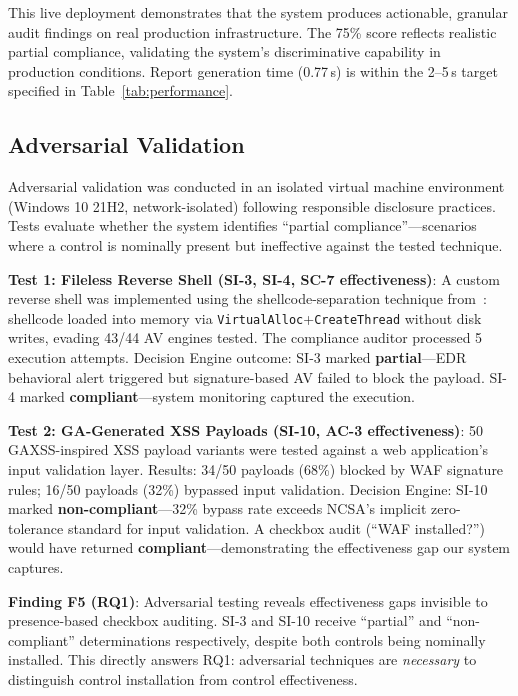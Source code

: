 \documentclass[futureinternet,article,submit,pdftex,moreauthors]{Definitions/mdpi}
\begin{document}
This live deployment demonstrates that the system produces actionable, granular audit findings
on real production infrastructure. The 75\% score reflects realistic partial compliance,
validating the system's discriminative capability in production conditions. Report generation
time (0.77\,s) is within the 2--5\,s target specified in Table~\ref{tab:performance}.

\subsection{Adversarial Validation}
\label{sec:adversarial}

Adversarial validation was conducted in an isolated virtual machine environment (Windows 10
21H2, network-isolated) following responsible disclosure practices. Tests evaluate whether the
system identifies ``partial compliance''---scenarios where a control is nominally present but
ineffective against the tested technique.

\textbf{Test 1: Fileless Reverse Shell (SI-3, SI-4, SC-7 effectiveness)}: A custom reverse
shell was implemented using the shellcode-separation technique from~\cite{reverse_shell_paper}:
shellcode loaded into memory via \texttt{VirtualAlloc}+\texttt{CreateThread} without disk
writes, evading 43/44 AV engines tested. The compliance auditor processed 5 execution attempts.
Decision Engine outcome: SI-3 marked \textbf{partial}---EDR behavioral alert triggered but
signature-based AV failed to block the payload. SI-4 marked \textbf{compliant}---system
monitoring captured the execution.

\textbf{Test 2: GA-Generated XSS Payloads (SI-10, AC-3 effectiveness)}: 50 GAXSS-inspired
XSS payload variants were tested against a web application's input validation layer. Results:
34/50 payloads (68\%) blocked by WAF signature rules; 16/50 payloads (32\%) bypassed input
validation. Decision Engine: SI-10 marked \textbf{non-compliant}---32\% bypass rate exceeds
NCSA's implicit zero-tolerance standard for input validation. A checkbox audit (``WAF
installed?'') would have returned \textbf{compliant}---demonstrating the effectiveness gap
our system captures.

\textbf{Finding F5 (RQ1)}: Adversarial testing reveals effectiveness gaps invisible to
presence-based checkbox auditing. SI-3 and SI-10 receive ``partial'' and ``non-compliant''
determinations respectively, despite both controls being nominally installed. This directly
answers RQ1: adversarial techniques are \textit{necessary} to distinguish control installation
from control effectiveness.
\end{document}
